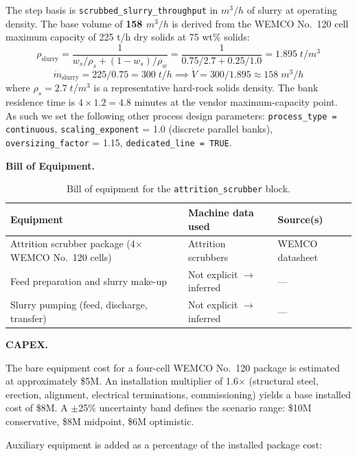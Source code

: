 The step basis is \texttt{scrubbed\_slurry\_throughput} in $\si{m^3/h}$ of slurry at operating density. The base volume of \textbf{158 $\si{m^3/h}$} is derived from the WEMCO No.\ 120 cell maximum capacity of 225 t/h dry solids at 75 wt\% solids:
\[
	\rho_{\text{slurry}} = \frac{1}{w_s/\rho_s + (1-w_s)/\rho_w} = \frac{1}{0.75/2.7 + 0.25/1.0} = 1.895\;\si{t/m^3}
\]
\[
	\dot{m}_{\text{slurry}} = 225/0.75 = 300\;\si{t/h} \implies \dot{V} = 300/1.895 \approx 158\;\si{m^3/h}
\]
where $\rho_s = 2.7\;\si{t/m^3}$ is a representative hard-rock solids density. The bank residence time is $4 \times 1.2 = 4.8$ minutes at the vendor maximum-capacity point. As such we set the following other process design parameters: \texttt{process\_type = continuous}, \texttt{scaling\_exponent} = 1.0 (discrete parallel banks), \texttt{oversizing\_factor} = 1.15, \texttt{dedicated\_line = TRUE}.

\medskip
\noindent\textbf{Bill of Equipment.}\quad

\begin{table}[h!]
\caption{Bill of equipment for the \texttt{attrition\_scrubber} block.}
\centering
\begin{tabular}{>{\raggedright\arraybackslash}p{5.2cm}
				>{\raggedright\arraybackslash}p{4cm}
				>{\raggedright\arraybackslash}p{4.5cm}}
\toprule
\textbf{Equipment} & \textbf{Machine data used} & \textbf{Source(s)} \\
\midrule
Attrition scrubber package (4$\times$ WEMCO No.\ 120 cells) & Attrition scrubbers & WEMCO datasheet \\
Feed preparation and slurry make-up & Not explicit $\rightarrow$ inferred & --- \\
Slurry pumping (feed, discharge, transfer) & Not explicit $\rightarrow$ inferred & --- \\
\bottomrule
\end{tabular}
\end{table}


\medskip
\noindent\textbf{CAPEX.}\quad

The bare equipment cost for a four-cell WEMCO No.\ 120 package is estimated at approximately \$5M. An installation multiplier of 1.6$\times$ (structural steel, erection, alignment, electrical terminations, commissioning) yields a base installed cost of \$8M. A $\pm$25\% uncertainty band defines the scenario range: \$10M conservative, \$8M midpoint, \$6M optimistic.

Auxiliary equipment is added as a percentage of the installed package cost:

